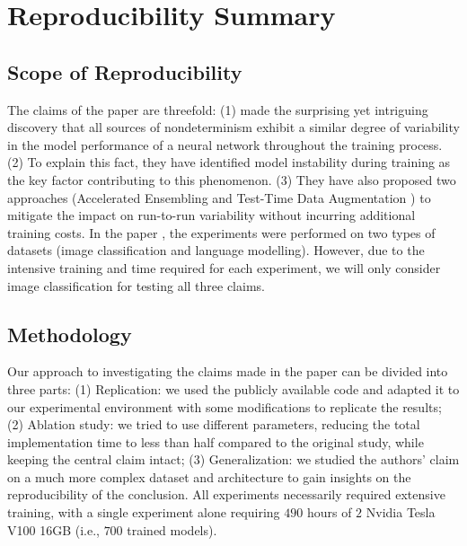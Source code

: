 \section*{\centering Reproducibility Summary}
\subsection*{Scope of Reproducibility}
The claims of the paper \cite{summers2021nondeterminism} are threefold: (1) \citet{summers2021nondeterminism} made the surprising yet intriguing discovery that all sources of nondeterminism exhibit a similar degree of variability in the model performance of a neural network throughout the training process. (2) To explain this fact, they have identified model instability during training as the key factor contributing to this phenomenon. (3) They have also proposed two approaches (Accelerated Ensembling \cite{wen2020batchensemble} and Test-Time Data Augmentation \cite{szegedy2015going}) to mitigate the impact on run-to-run variability without incurring additional training costs. In the paper \cite{summers2021nondeterminism}, the experiments were performed on two types of datasets (image classification and language modelling). However, due to the intensive training and time required for each experiment, we will only consider image classification for testing all three claims.
 

\subsection*{Methodology}

Our approach to investigating the claims made in the paper \cite{summers2021nondeterminism} can be divided into three parts: (1) Replication: we used the publicly available code and adapted it to our experimental environment with some modifications to replicate the results; (2) Ablation study: we tried to use different parameters, reducing the total implementation time to less than half compared to the original study, while keeping the central claim intact; (3) Generalization: we studied the authors' claim on a much more complex dataset and architecture to gain insights on the reproducibility of the conclusion. 
All experiments necessarily required extensive training, with a single experiment alone requiring $490$ hours of $2$ Nvidia Tesla V100 16GB (i.e., $700$ trained models).


